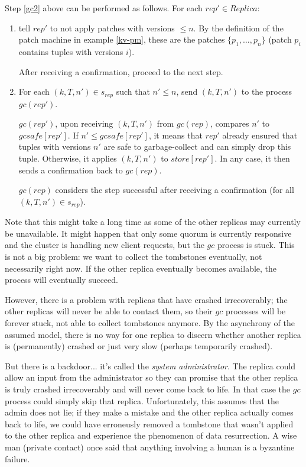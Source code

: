 \documentclass[12pt,a4paper,en]{pracamgr}
\newcommand{\ti}[1]{\textit{#1}}
\begin{document}
Step \ref{gc2} above can be performed as follows. For each $rep' \in Replica$:
\begin{enumerate}
    \item tell $rep'$ to not apply patches with versions $\le n$. By the definition of the patch machine in example \ref{kv-pm}, these are the patches $\{p_1, \dots, p_n\}$ (patch $p_i$ contains tuples with versions $i$).

        After receiving a confirmation, proceed to the next step.
    \item For each $(k, T, n') \in s_{rep}$ such that $n' \le n$, send $(k, T, n')$ to the process $gc(rep')$.

        $gc(rep')$, upon receiving $(k, T, n')$ from $gc(rep)$, compares $n'$ to $gcsafe[rep']$. If $n' \le gcsafe[rep']$, it means that $rep'$ already ensured that tuples with versions $n'$ are safe to garbage-collect and can simply drop this tuple. Otherwise, it applies $(k, T, n')$ to $store[rep']$. In any case, it then sends a confirmation back to $gc(rep)$.

        $gc(rep)$ considers the step successful after receiving a confirmation (for all $(k, T, n') \in s_{rep}$).
\end{enumerate}

Note that this might take a long time as some of the other replicas may currently be unavailable. It might happen that only some quorum is currently responsive and the cluster is handling new client requests, but the $gc$ process is stuck. This is not a big problem: we want to collect the tombstones eventually, not necessarily right now. If the other replica eventually becomes available, the process will eventually succeed.

However, there is a problem with replicas that have crashed irrecoverably; the other replicas will never be able to contact them, so their $gc$ processes will be forever stuck, not able to collect tombstones anymore. By the asynchrony of the assumed model, there is no way for one replica to discern whether another replica is (permanently) crashed or just very slow (perhaps temporarily crashed).

But there is a backdoor... it's called the \ti{system administrator}. The replica could allow an input from the administrator so they can promise that the other replica is truly crashed irrecoverably and will never come back to life. In that case the $gc$ process could simply skip that replica. Unfortunately, this assumes that the admin does not lie; if they make a mistake and the other replica actually comes back to life, we could have erroneusly removed a tombstone that wasn't applied to the other replica and experience the phenomenon of data resurrection. A wise man (private contact) once said that anything involving a human is a byzantine failure.
\end{document}
